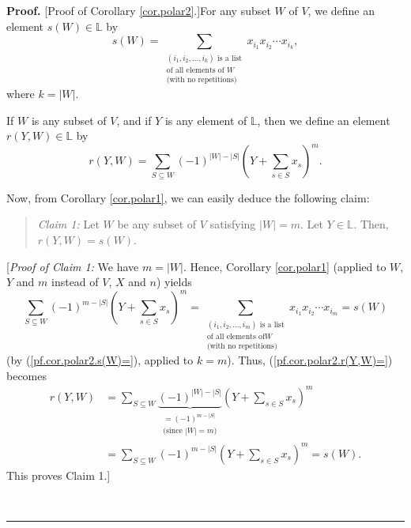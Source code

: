 \documentclass[numbers=enddot,12pt,final,onecolumn,notitlepage]{scrartcl}%
\theoremstyle{definition}
\newenvironment{statement}{\begin{quote}}{\end{quote}}
\newenvironment{proof}[1][Proof]{\noindent\textbf{#1.} }{\ \rule{0.5em}{0.5em}}
\let\sumnonlimits\sum
\renewcommand{\sum}{\sumnonlimits\limits}
\begin{document}
\begin{proof}
[Proof of Corollary \ref{cor.polar2}.]For any subset $W$ of $V$, we define an
element $s\left(  W\right)  \in\mathbb{L}$ by%
\begin{equation}
s\left(  W\right)  =\sum_{\substack{\left(  i_{1},i_{2},\ldots,i_{k}\right)
\text{ is a list}\\\text{of all elements of }W\\\text{(with no repetitions)}%
}}x_{i_{1}}x_{i_{2}}\cdots x_{i_{k}}, \label{pf.cor.polar2.s(W)=}%
\end{equation}
where $k=\left\vert W\right\vert $.

If $W$ is any subset of $V$, and if $Y$ is any element of $\mathbb{L}$, then
we define an element $r\left(  Y,W\right)  \in\mathbb{L}$ by%
\begin{equation}
r\left(  Y,W\right)  =\sum_{S\subseteq W}\left(  -1\right)  ^{\left\vert
W\right\vert -\left\vert S\right\vert }\left(  Y+\sum_{s\in S}x_{s}\right)
^{m}. \label{pf.cor.polar2.r(Y,W)=}%
\end{equation}


Now, from Corollary \ref{cor.polar1}, we can easily deduce the following claim:

\begin{statement}
\textit{Claim 1:} Let $W$ be any subset of $V$ satisfying $\left\vert
W\right\vert =m$. Let $Y\in\mathbb{L}$. Then, $r\left(  Y,W\right)  =s\left(
W\right)  $.
\end{statement}

[\textit{Proof of Claim 1:} We have $m=\left\vert W\right\vert $. Hence,
Corollary \ref{cor.polar1} (applied to $W$, $Y$ and $m$ instead of $V$, $X$
and $n$) yields%
\[
\sum_{S\subseteq W}\left(  -1\right)  ^{m-\left\vert S\right\vert }\left(
Y+\sum_{s\in S}x_{s}\right)  ^{m}=\sum_{\substack{\left(  i_{1},i_{2}%
,\ldots,i_{m}\right)  \text{ is a list}\\\text{of all elements of
}W\\\text{(with no repetitions)}}}x_{i_{1}}x_{i_{2}}\cdots x_{i_{m}}=s\left(
W\right)
\]
(by (\ref{pf.cor.polar2.s(W)=}), applied to $k=m$). Thus,
(\ref{pf.cor.polar2.r(Y,W)=}) becomes%
\begin{align*}
r\left(  Y,W\right)   &  =\sum_{S\subseteq W}\underbrace{\left(  -1\right)
^{\left\vert W\right\vert -\left\vert S\right\vert }}_{\substack{=\left(
-1\right)  ^{m-\left\vert S\right\vert }\\\text{(since }\left\vert
W\right\vert =m\text{)}}}\left(  Y+\sum_{s\in S}x_{s}\right)  ^{m}\\
&  =\sum_{S\subseteq W}\left(  -1\right)  ^{m-\left\vert S\right\vert }\left(
Y+\sum_{s\in S}x_{s}\right)  ^{m}=s\left(  W\right)  .
\end{align*}
This proves Claim 1.]


\end{proof}
\end{document}
